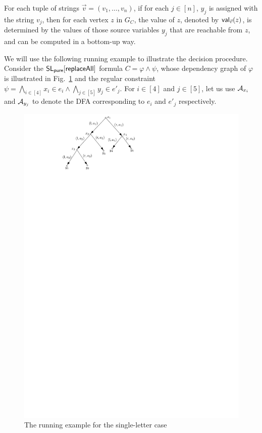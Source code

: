 For each tuple of strings $\vec{v}=(v_1,\dots, v_n)$, if for each $j \in [n]$, $y_j$ is assigned with the string $v_j$, then for each vertex $z$ in $G_C$, the value of $z$, denoted by $\mathsf{val}_{\vec{v}}(z)$, is determined by the values of those source variables $y_j$ that are reachable from $z$, and can be computed in a bottom-up way. 

\smallskip


We will use the following running example to illustrate the decision procedure.
Consider the $\mathsf{SL_{pure}}[\mathsf{replaceAll}]$ formula $C=\varphi \wedge \psi$, whose dependency graph of $\varphi$ is illustrated in Fig.~\ref{fig-one-letter} and the regular constraint $\psi = \bigwedge \limits_{i \in [4]} x_i \in e_i \wedge \bigwedge \limits_{j \in [5]} y_j \in e'_j$. For $i \in [4]$ and $j \in [5]$, let us use $\mathcal{A}_{x_i}$ and $\mathcal{A}_{y_j}$ to denote the DFA corresponding to $e_i$ and $e'_j$ respectively.
\begin{figure}[htbp]
	\begin{center}
		\includegraphics[scale=0.9]{single-letter-example.pdf}
	\end{center}
	\caption{The running example for the single-letter case}\label{fig-one-letter}
\end{figure}
%



